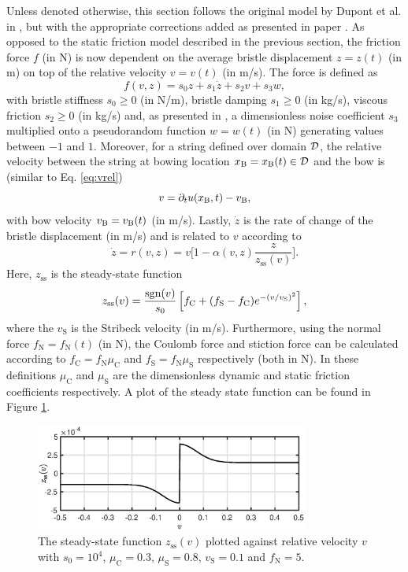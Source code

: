 Unless denoted otherwise, this section follows the original model by Dupont et al. in \cite{Dupont2002}, but with the appropriate corrections added as presented in paper \citeP[C]. As opposed to the static friction model described in the previous section, the friction force $f$ (in N) is now dependent on the average bristle displacement $z = z(t)$ (in m) on top of the relative velocity $v = v(t)$ (in m/s). The force is defined as
\begin{equation}\label{eq:elastoPlasticForce}
    f(v, z) = s_0z + s_1\dot z + s_2v + s_3w,
\end{equation}
with bristle stiffness $s_0 \geq 0$ (in N/m), bristle damping $s_1 \geq 0$ (in kg/s), viscous friction $s_2 \geq 0$ (in kg/s) and, as presented in \cite{Serafin2004}, a dimensionless noise coefficient $s_3$ multiplied onto a pseudorandom function $w = w(t)$ (in N) generating values between $-1$ and $1$. Moreover, for a string defined over domain $\mathcal{D}$, the relative velocity between the string at bowing location $x_{\text{B}} = x_{\text{B}}(t) \in \mathcal{D}$ and the bow is (similar to Eq. \eqref{eq:vrel})
\begin{equation}\label{eq:vrelElasto}
    v = \partial_t u(x_{\text{B}},t) - v_{\text{B}},
\end{equation}
with bow velocity $v_{\text{B}} = v_{\text{B}}(t)$ (in m/s). Lastly, $\dot z$ is the rate of change of the bristle displacement (in m/s) and is related to $v$ according to
\begin{equation}\label{eq:zdot}
    \dot z = r(v, z) = v \bigg[ 1-  \alpha(v, z)\frac{z}{z_\text{ss}(v)}\bigg].
\end{equation}
Here, $z_\text{ss}$ is the steady-state function
\begin{equation}\label{eq:zss}
    z_\text{ss}(v) = \frac{\text{sgn}(v)}{s_0}\left[f_\text{C}+(f_\text{S}-f_\text{C})e^{-(v/v_\text{S})^2}\right],
\end{equation}
where the $v_\text{S}$ is the Stribeck velocity (in m/s). Furthermore, using the normal force $f_\text{N} = f_\text{N}(t)$ (in N), the Coulomb force and stiction force can be calculated according to $f_\text{C} = f_\text{N}\mu_\text{C}$ and $f_\text{S} = f_\text{N}\mu_\text{S}$ respectively (both in N). In these definitions $\mu_\text{C}$ and $\mu_\text{S}$ are the dimensionless dynamic and static friction coefficients respectively. A plot of the steady state function can be found in Figure \ref{fig:zss}.

\begin{figure}[ht]
    \centering
    \includegraphics[width=0.8\textwidth]{figures/exciters/steadyState.eps}
    \caption{\label{fig:zss}The steady-state function $z_\text{ss}(v)$ plotted against relative velocity $v$ with $s_0 = 10^4$, $\mu_\text{C} = 0.3$, $\mu_\text{S} = 0.8$, $v_\text{S} = 0.1$ and $f_\text{N} = 5$.}
\end{figure}


